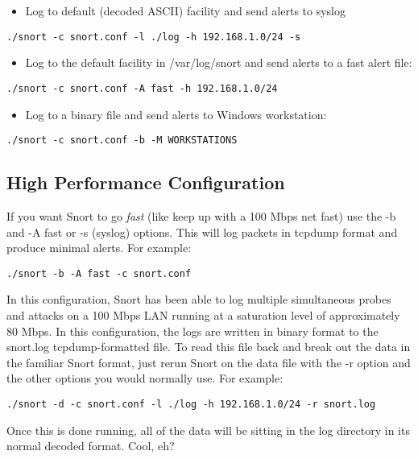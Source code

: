 \documentclass[english]{report}
\begin{document}
\begin{itemize}
\item Log to default (decoded ASCII) facility and send alerts to syslog 
\end{itemize}
\begin{verbatim}
./snort -c snort.conf -l ./log -h 192.168.1.0/24 -s
\end{verbatim}
\begin{itemize}
\item Log to the default facility in /var/log/snort and send alerts to a
fast alert file: 
\end{itemize}
\begin{verbatim}
./snort -c snort.conf -A fast -h 192.168.1.0/24
\end{verbatim}
\begin{itemize}
\item Log to a binary file and send alerts to Windows workstation: 
\end{itemize}
\begin{verbatim}
./snort -c snort.conf -b -M WORKSTATIONS
\end{verbatim}

\subsection{High Performance Configuration}

If you want Snort to go \emph{fast} (like keep up with a 100 Mbps
net fast) use the -b and -A fast
or -s (syslog) options. This will log packets
in tcpdump format and produce minimal alerts. For example:

\begin{verbatim}
./snort -b -A fast -c snort.conf
\end{verbatim}
In this configuration, Snort has been able to log multiple simultaneous
probes and attacks on a 100 Mbps LAN running at a saturation level
of approximately 80 Mbps. In this configuration, the logs are written
in binary format to the snort.log tcpdump-formatted file. To read
this file back and break out the data in the familiar Snort format,
just rerun Snort on the data file with the -r
option and the other options you would normally use. For example:

\begin{verbatim}
./snort -d -c snort.conf -l ./log -h 192.168.1.0/24 -r snort.log 
\end{verbatim}
Once this is done running, all of the data will be sitting in the
log directory in its normal decoded format. Cool, eh?
\end{document}
